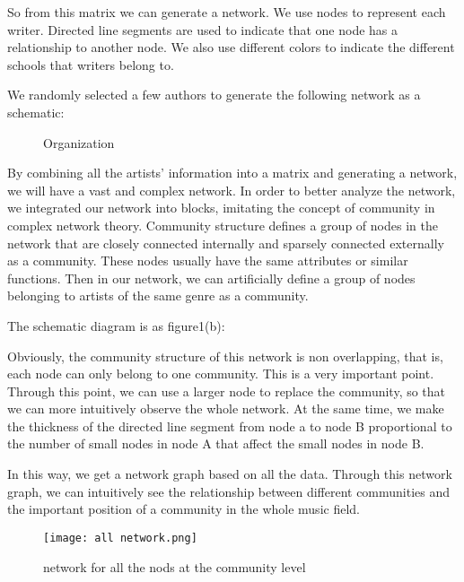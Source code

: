 \documentclass[12pt]{article}  %
\begin{document}
So from this matrix we can generate a network. We use nodes to represent each writer. Directed line segments are used to indicate that one node has a relationship to another node.
We also use different colors to indicate the different schools that writers belong to.

We randomly selected a few authors to generate the following network as a schematic:

\begin{figure}[H]
	\centering    
	\caption{Organization}		%
	\label{fig:hot}									%
\end{figure}


By combining all the artists' information into a matrix and generating a network, we will have a vast and complex network. In order to better analyze the network, we integrated our network into blocks, imitating the concept of community in complex network theory. Community structure defines a group of nodes in the network that are closely connected internally and sparsely connected externally as a community. These nodes usually have the same attributes or similar functions. Then in our network, we can artificially define a group of nodes belonging to artists of the same genre as a community.

The schematic diagram is as figure1(b):

Obviously, the community structure of this network is non overlapping, that is, each node can only belong to one community. This is a very important point. Through this point, we can use a larger node to replace the community, so that we can more intuitively observe the whole network. At the same time, we make the thickness of the directed line segment from node a to node B proportional to the number of small nodes in node A that affect the small nodes in node B.

In this way, we get a network graph based on all the data. Through this network graph, we can intuitively see the relationship between different communities and the important position of a community in the whole music field.

\begin{figure}[H]
	\centering
	\texttt{[image: all network.png]}
	\caption{network for all the nods at the community level}
	\label{img}
\end{figure}
\end{document}
